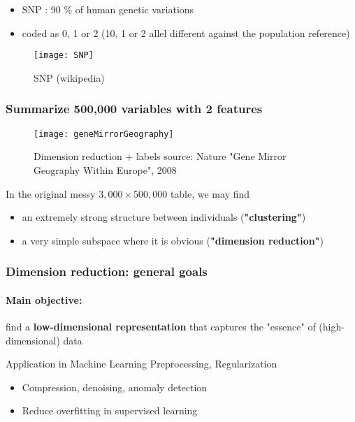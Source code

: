 \documentclass[
  ignorenonframetext,
]{beamer}
\begin{document}
\begin{frame}
\begin{frame}[fragile]
\begin{multicols}{2}
  \begin{itemize}
  \item SNP : 90 \% of human genetic variations
  \item coded as 0, 1 or 2 (10, 1 or 2 allel different against the population reference)
  \end{itemize}

  \begin{figure}
    \centering
     \texttt{[image: SNP]}   
    \caption{SNP (wikipedia)}
  \end{figure}
\end{multicols}

\end{frame}

\begin{frame}
  \frametitle{Summarize 500,000 variables with 2 features}

  \begin{figure}
    \centering
      \texttt{[image: geneMirrorGeography]}
    \caption{Dimension reduction + labels {\tiny source: Nature "Gene  Mirror Geography Within  Europe", 2008}}
  \end{figure}

  In the original messy $3,000 \times 500,000$ table, we may find
  \begin{itemize}
    \item an extremely strong structure between individuals (\alert{\bf "clustering"})
    \item a very simple subspace where it is obvious (\alert{\bf "dimension reduction"})
  \end{itemize}

\end{frame}

\begin{frame}[label=DimensionReduction]
  \frametitle{Dimension reduction: general goals}

  \paragraph{Main objective:} find a \alert{\bf low-dimensional representation} that captures the "essence" of (high-dimensional) data

  \vfill

  \begin{block}{Application in Machine Learning}
  \alert{Preprocessing, Regularization}
  \begin{itemize}
    \item Compression, denoising,  anomaly detection
    \item Reduce overfitting in supervised learning
  \end{itemize}
  \end{block}


\end{frame}
\end{frame}
\end{document}
